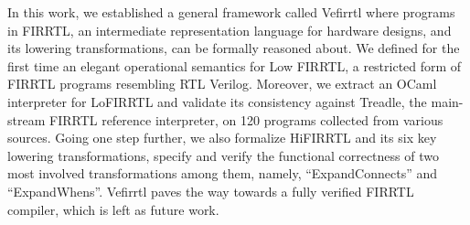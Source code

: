
In this work, we established a general framework called Vefirrtl where programs in FIRRTL, an intermediate representation language for hardware designs, and its lowering transformations, can be formally reasoned about. We defined for the first time an elegant operational semantics for Low FIRRTL, a restricted form of FIRRTL programs resembling RTL Verilog. Moreover, we extract an OCaml interpreter for LoFIRRTL and validate its consistency against Treadle, the main-stream FIRRTL reference interpreter, on 120 programs collected from various sources.  Going one step further, we also formalize HiFIRRTL and its six key lowering transformations, specify and verify the functional correctness of two most involved transformations among them, namely, ``ExpandConnects'' and ``ExpandWhens''.  Vefirrtl paves the way towards a fully verified FIRRTL compiler, which is left as future work. 